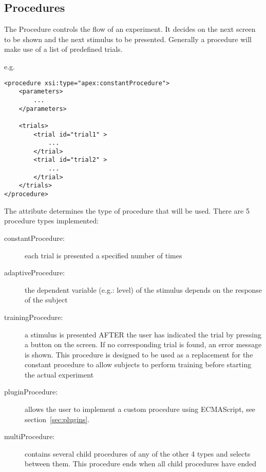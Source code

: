 
\subsection{Procedures}

\label{sec:procedures}

The Procedure controls the flow of an experiment. It decides on the
next screen to be shown and the next stimulus to be presented.
Generally a procedure will make use of a list of predefined
trials.

e.g.
\begin{lstlisting}
<procedure xsi:type="apex:constantProcedure">
    <parameters>
        ...
    </parameters>

    <trials>
        <trial id="trial1" >
            ...
        </trial>
        <trial id="trial2" >
            ...
        </trial>
    </trials>
</procedure>
\end{lstlisting}


The  attribute determines the type of
procedure that will be used. There are 5 procedure types
implemented:

\begin{description} 


\item[constantProcedure:] each trial is presented a specified number of times

\item [adaptiveProcedure:] the dependent variable (e.g.: level) of the
stimulus depends on the response of the subject 

\item [trainingProcedure:] a stimulus is presented AFTER the
user has indicated the trial by pressing a button on the screen.
If no corresponding trial is found, an error message is shown.
This procedure is designed to be used as a replacement for the
constant procedure to allow subjects to perform training before
starting the actual experiment

\item [pluginProcedure:] allows the user to implement a custom
procedure using ECMAScript, see section~\ref{sec:plugins}.

\item [multiProcedure:] contains several child procedures of any of the other 4 types and
selects between them. This procedure ends when all child
procedures have ended
\end{description}


